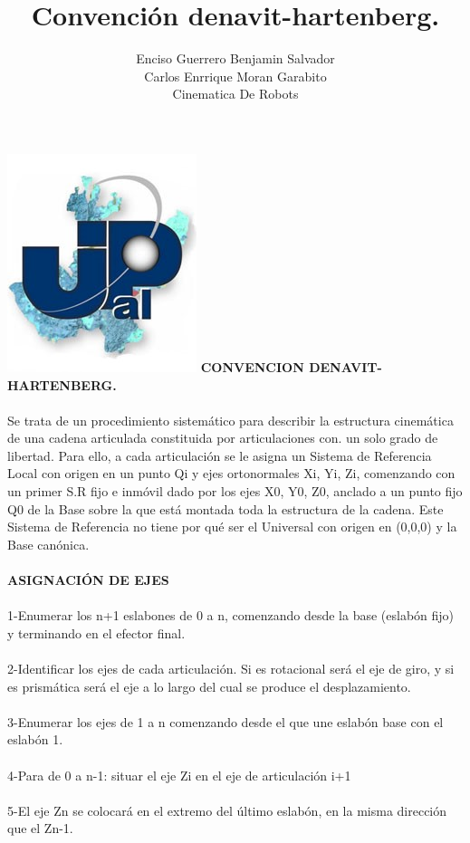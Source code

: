 \documentclass[12pt,a4paper]{article}
\author{Enciso Guerrero Benjamin Salvador\\
Carlos Enrrique Moran Garabito\\
Cinematica De Robots }
\title{Convención denavit-hartenberg.}
\begin{document}
\maketitle
\includegraphics[scale=1.8]{upzmgg.jpg} 
\newpage
\textbf{CONVENCION DENAVIT-HARTENBERG.}
\\\\
Se trata de un procedimiento sistemático para describir la estructura cinemática de una cadena articulada constituida por articulaciones con. un solo grado de libertad. Para ello, a cada articulación se le asigna un Sistema de Referencia Local con origen en un punto Qi y ejes ortonormales {Xi, Yi, Zi}, comenzando con un primer S.R fijo e inmóvil dado por los ejes {X0, Y0, Z0}, anclado a un punto fijo Q0 de la Base sobre la que está montada toda la estructura de la cadena. Este Sistema de Referencia no tiene por qué ser el Universal con origen en (0,0,0) y la Base canónica.\\\\
\textbf{ASIGNACIÓN DE EJES}
\\\\
1-Enumerar los n+1 eslabones de 0 a n, comenzando desde la base (eslabón fijo) y terminando en el efector final.
\\\\
2-Identificar los ejes de cada articulación. Si es rotacional será el eje de giro, y si es prismática será el eje a lo largo del cual se produce el desplazamiento.
\\\\
3-Enumerar los ejes de 1 a n comenzando desde el que une eslabón base con el eslabón 1.
\\\\
4-Para de 0 a n-1: situar el eje Zi en el eje de articulación i+1
\\\\
5-El eje Zn se colocará en el extremo del último eslabón, en la misma dirección que el Zn-1.
\end{document}
